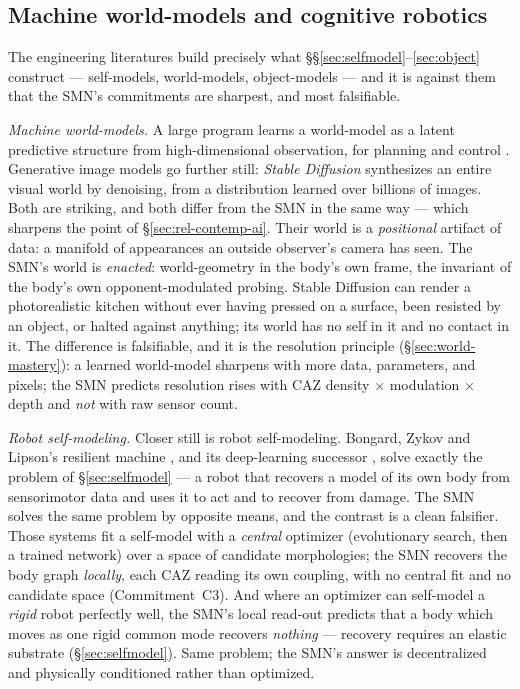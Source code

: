 \documentclass{article}
\begin{document}
\subsection{Machine world-models and cognitive robotics}\label{sec:rel-robotics}

The engineering literatures build precisely what
\S\S\ref{sec:selfmodel}--\ref{sec:object} construct --- self-models,
world-models, object-models --- and it is against them that the SMN's
commitments are sharpest, and most falsifiable.

\emph{Machine world-models.}  A large program learns a world-model as a
latent predictive structure from high-dimensional observation, for
planning and control
\citep{Ha2018WorldModels,LeCun2022WorldModels,Hafner2020Dreamer}.
Generative image models go further still: \emph{Stable Diffusion}
\citep{Rombach2022LatentDiffusion} synthesizes an entire visual world by
denoising, from a distribution learned over billions of images.  Both are
striking, and both differ from the SMN in the same way --- which sharpens
the point of \S\ref{sec:rel-contemp-ai}.  Their world is a
\emph{positional} artifact of data: a manifold of appearances an outside
observer's camera has seen.  The SMN's world is \emph{enacted}:
world-geometry in the body's own frame, the invariant of the body's own
opponent-modulated probing.  Stable Diffusion can render a photorealistic
kitchen without ever having pressed on a surface, been resisted by an
object, or halted against anything; its world has no self in it and no
contact in it.  The difference is falsifiable, and it is the resolution
principle (\S\ref{sec:world-mastery}): a learned world-model sharpens
with more data, parameters, and pixels; the SMN predicts resolution rises
with CAZ density $\times$ modulation $\times$ depth and \emph{not} with
raw sensor count.

\emph{Robot self-modeling.}  Closer still is robot self-modeling.
Bongard, Zykov and Lipson's resilient machine
\citep{Bongard2006SelfModeling}, and its deep-learning successor
\citep{Kwiatkowski2019SelfModeling}, solve exactly the problem of
\S\ref{sec:selfmodel} --- a robot that recovers a model of its own body
from sensorimotor data and uses it to act and to recover from damage.
The SMN solves the same problem by opposite means, and the contrast is a
clean falsifier.  Those systems fit a self-model with a \emph{central}
optimizer (evolutionary search, then a trained network) over a space of
candidate morphologies; the SMN recovers the body graph \emph{locally},
each CAZ reading its own coupling, with no central fit and no candidate
space (Commitment~C3).  And where an optimizer can self-model a
\emph{rigid} robot perfectly well, the SMN's local read-out predicts that
a body which moves as one rigid common mode recovers \emph{nothing} ---
recovery requires an elastic substrate (\S\ref{sec:selfmodel}).  Same
problem; the SMN's answer is decentralized and physically conditioned
rather than optimized.
\end{document}
